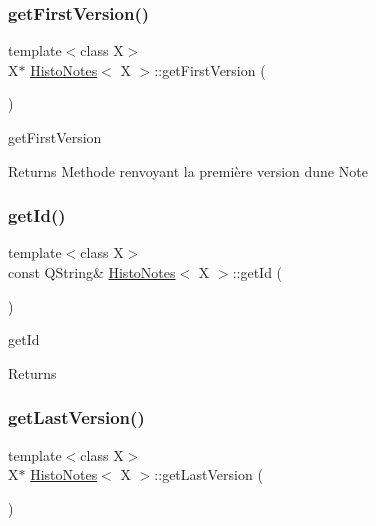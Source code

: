 \subsubsection{\texorpdfstring{get\+First\+Version()}{getFirstVersion()}}
{\footnotesize\ttfamily template$<$class X$>$ \\
X$\ast$ \hyperlink{class_histo_notes}{Histo\+Notes}$<$ X $>$\+::get\+First\+Version (\begin{DoxyParamCaption}{ }\end{DoxyParamCaption})\hspace{0.3cm}{\ttfamily [inline]}}



get\+First\+Version 

\begin{DoxyReturn}{Returns}
Methode renvoyant la première version d\textquotesingle{}une Note 
\end{DoxyReturn}
\mbox{\label{class_histo_notes_ad63d626540a8ef0f59cd2019dd351e38}} 
\subsubsection{\texorpdfstring{get\+Id()}{getId()}}
{\footnotesize\ttfamily template$<$class X$>$ \\
const Q\+String\& \hyperlink{class_histo_notes}{Histo\+Notes}$<$ X $>$\+::get\+Id (\begin{DoxyParamCaption}{ }\end{DoxyParamCaption})\hspace{0.3cm}{\ttfamily [inline]}}



get\+Id 

\begin{DoxyReturn}{Returns}

\end{DoxyReturn}
\mbox{\label{class_histo_notes_adb66fa74f80e761f52889d67327e2c4f}} 
\subsubsection{\texorpdfstring{get\+Last\+Version()}{getLastVersion()}}
{\footnotesize\ttfamily template$<$class X$>$ \\
X$\ast$ \hyperlink{class_histo_notes}{Histo\+Notes}$<$ X $>$\+::get\+Last\+Version (\begin{DoxyParamCaption}{ }\end{DoxyParamCaption})\hspace{0.3cm}{\ttfamily [inline]}}



